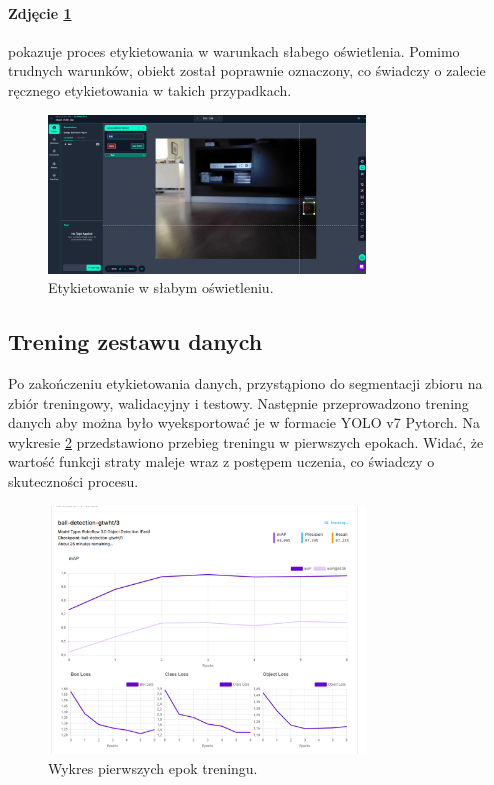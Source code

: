 \documentclass[a4paper,twoside,12pt]{book}
\begin{document}
\paragraph{Zdjęcie \ref{fig:labeling3}}
pokazuje proces etykietowania w warunkach słabego oświetlenia. Pomimo trudnych warunków, obiekt został poprawnie oznaczony, co świadczy o zalecie ręcznego etykietowania w takich przypadkach.

\begin{figure}[h]
    \centering
    \includegraphics[width=0.75\textwidth]{Images/Roboflow/labeling3.png}
    \caption{Etykietowanie w słabym oświetleniu.}
    \label{fig:labeling3}
\end{figure}

\newpage

\subsection{Trening zestawu danych}
Po zakończeniu etykietowania danych, przystąpiono do segmentacji zbioru na zbiór treningowy, walidacyjny i testowy.
Następnie przeprowadzono trening danych aby można było wyeksportować je w formacie YOLO v7 Pytorch.
Na wykresie \ref{fig:Wykrespoczatek} przedstawiono przebieg treningu w pierwszych epokach. Widać, że wartość funkcji straty maleje wraz z postępem uczenia, co świadczy o skuteczności procesu.

\begin{figure}[h]
    \centering
    \includegraphics[width=0.75\textwidth]{Images/Roboflow/poczatek uczenia.png}
    \caption{Wykres pierwszych epok treningu.}
    \label{fig:Wykrespoczatek}
\end{figure}
\end{document}
